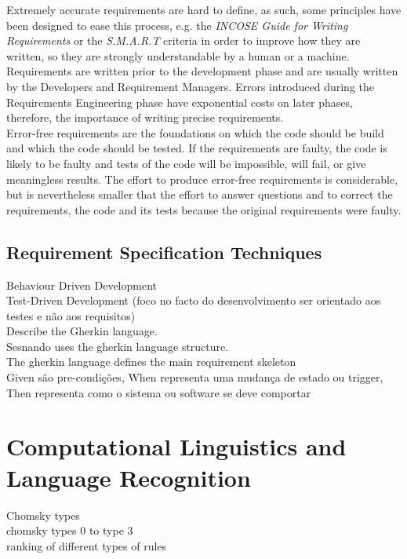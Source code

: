 Extremely accurate requirements are hard to define, as such, some principles have been designed to ease this process, e.g. the \textit{INCOSE Guide for Writing Requirements} \cite{incose} or the \textit{S.M.A.R.T} criteria \cite{mannion_smart_2004} in order to improve how they are written, so they are strongly understandable by a human or a machine.\\
Requirements are written prior to the development phase and are usually written by the Developers and Requirement Managers. Errors introduced during the Requirements Engineering phase have exponential costs on later phases, therefore, the importance of writing precise requirements. \\
Error-free requirements are the foundations on which the code should be build and which the code should be tested. If the requirements are faulty, the code is likely to be faulty and tests of the code will be impossible, will fail, or give meaningless results. The effort to produce error-free requirements is considerable, but is nevertheless smaller that the effort to answer questions and to correct the requirements, the code and its tests because the original requirements were faulty.



\subsection{Requirement Specification Techniques}
\label{subsec:requirement_specification}

Behaviour Driven Development\\
Test-Driven Development (foco no facto do desenvolvimento ser orientado aos testes e não aos requisitos)\\
Describe the Gherkin language.\\
Sesnando uses the gherkin language structure.\\
The gherkin language defines the main requirement skeleton\\
Given são pre-condições, When representa uma mudança de estado ou trigger, Then representa como o sistema ou software se deve comportar\\


\section{Computational Linguistics and Language Recognition}
\label{sec:computational_linguistics}


Chomsky types\\
chomsky types 0 to type 3\\
ranking of different types of rules


